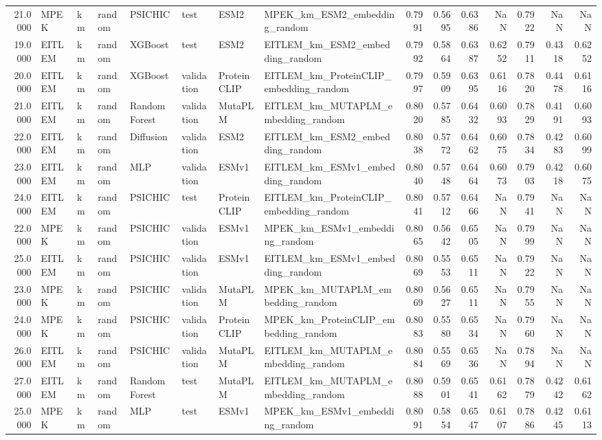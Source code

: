 \begin{tabular}{rlllllllrrrrrrr}
21.0000 & MPEK & km & random & PSICHIC & test & ESM2 & MPEK_km_ESM2_embedding_random & 0.7991 & 0.5695 & 0.6386 & NaN & 0.7922 & NaN & NaN \\
19.0000 & EITLEM & km & random & XGBoost & test & ESM2 & EITLEM_km_ESM2_embedding_random & 0.7992 & 0.5864 & 0.6387 & 0.6252 & 0.7911 & 0.4318 & 0.6252 \\
20.0000 & EITLEM & km & random & XGBoost & validation & ProteinCLIP & EITLEM_km_ProteinCLIP_embedding_random & 0.7997 & 0.5909 & 0.6395 & 0.6116 & 0.7820 & 0.4478 & 0.6116 \\
21.0000 & EITLEM & km & random & Random Forest & validation & MutaPLM & EITLEM_km_MUTAPLM_embedding_random & 0.8020 & 0.5785 & 0.6432 & 0.6093 & 0.7829 & 0.4191 & 0.6093 \\
22.0000 & EITLEM & km & random & Diffusion & validation & ESM2 & EITLEM_km_ESM2_embedding_random & 0.8038 & 0.5772 & 0.6462 & 0.6075 & 0.7834 & 0.4283 & 0.6099 \\
23.0000 & EITLEM & km & random & MLP & validation & ESMv1 & EITLEM_km_ESMv1_embedding_random & 0.8040 & 0.5748 & 0.6464 & 0.6073 & 0.7903 & 0.4218 & 0.6075 \\
24.0000 & EITLEM & km & random & PSICHIC & test & ProteinCLIP & EITLEM_km_ProteinCLIP_embedding_random & 0.8041 & 0.5712 & 0.6466 & NaN & 0.7941 & NaN & NaN \\
22.0000 & MPEK & km & random & PSICHIC & validation & ESMv1 & MPEK_km_ESMv1_embedding_random & 0.8065 & 0.5642 & 0.6505 & NaN & 0.7999 & NaN & NaN \\
25.0000 & EITLEM & km & random & PSICHIC & validation & ESMv1 & EITLEM_km_ESMv1_embedding_random & 0.8069 & 0.5553 & 0.6511 & NaN & 0.7922 & NaN & NaN \\
23.0000 & MPEK & km & random & PSICHIC & validation & MutaPLM & MPEK_km_MUTAPLM_embedding_random & 0.8069 & 0.5627 & 0.6511 & NaN & 0.7955 & NaN & NaN \\
24.0000 & MPEK & km & random & PSICHIC & validation & ProteinCLIP & MPEK_km_ProteinCLIP_embedding_random & 0.8083 & 0.5580 & 0.6534 & NaN & 0.7960 & NaN & NaN \\
26.0000 & EITLEM & km & random & PSICHIC & validation & MutaPLM & EITLEM_km_MUTAPLM_embedding_random & 0.8084 & 0.5569 & 0.6536 & NaN & 0.7894 & NaN & NaN \\
27.0000 & EITLEM & km & random & Random Forest & test & MutaPLM & EITLEM_km_MUTAPLM_embedding_random & 0.8088 & 0.5901 & 0.6541 & 0.6162 & 0.7879 & 0.4242 & 0.6162 \\
25.0000 & MPEK & km & random & MLP & test & ESMv1 & MPEK_km_ESMv1_embedding_random & 0.8091 & 0.5854 & 0.6547 & 0.6107 & 0.7886 & 0.4245 & 0.6113 \\

\end{tabular}
